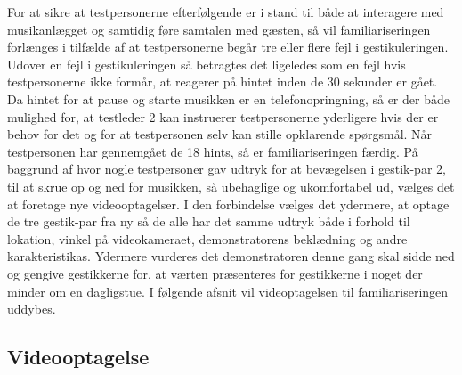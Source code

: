 For at sikre at testpersonerne efterfølgende er i stand til både at interagere med musikanlægget og samtidig føre samtalen med gæsten, så vil familiariseringen forlænges i tilfælde af at testpersonerne begår tre eller flere fejl i gestikuleringen. Udover en fejl i gestikuleringen så betragtes det ligeledes som en fejl hvis testpersonerne ikke formår, at reagerer på hintet inden de 30 sekunder er gået. Da hintet for at pause og starte musikken er en telefonopringning, så er der både mulighed for, at testleder 2 kan instruerer testpersonerne yderligere hvis der er behov for det og for at testpersonen selv kan stille opklarende spørgsmål. Når testpersonen har gennemgået de 18 hints, så er familiariseringen færdig. \blankline
%
På baggrund af  hvor nogle testpersoner gav udtryk for at bevægelsen i gestik-par 2, til at skrue op og ned for musikken, så ubehaglige og ukomfortabel ud, vælges det at foretage nye videooptagelser. I den forbindelse vælges det ydermere, at optage de tre gestik-par fra ny så de alle har det samme udtryk både i forhold til lokation, vinkel på videokameraet, demonstratorens beklædning og andre karakteristikas. Ydermere vurderes det demonstratoren denne gang skal sidde ned og gengive gestikkerne for, at værten præsenteres for gestikkerne i noget der minder om en dagligstue. I følgende afsnit vil videoptagelsen til familiariseringen uddybes. 
%
\subsection{Videooptagelse}
\label{VideooptagelseSocialAccept}
%



